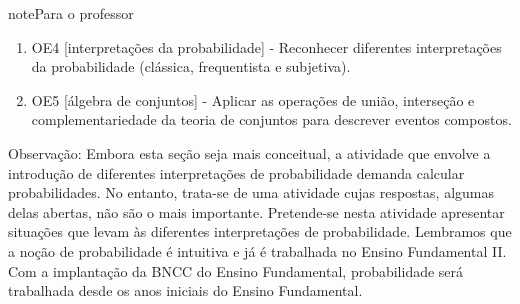 \begin{sphinxadmonition}{note}{Para o professor}
\begin{enumerate}
\item {} 
OE4 {[}interpretações da probabilidade{]} - Reconhecer diferentes interpretações da probabilidade (clássica, frequentista e subjetiva).

\item {} 
OE5 {[}álgebra de conjuntos{]} - Aplicar as operações de união, interseção e complementariedade da teoria de conjuntos para descrever eventos compostos.

\end{enumerate}

Observação: Embora esta seção seja mais conceitual, a atividade que envolve a introdução de diferentes interpretações de probabilidade demanda calcular probabilidades. No entanto, trata-se de uma atividade cujas respostas, algumas delas abertas, não são o mais importante. Pretende-se nesta atividade apresentar situações que levam às diferentes interpretações de probabilidade. Lembramos que a noção de probabilidade é intuitiva e já é trabalhada no Ensino Fundamental II. Com a implantação da BNCC do Ensino Fundamental, probabilidade será trabalhada desde os anos iniciais do Ensino Fundamental.
\end{sphinxadmonition}


